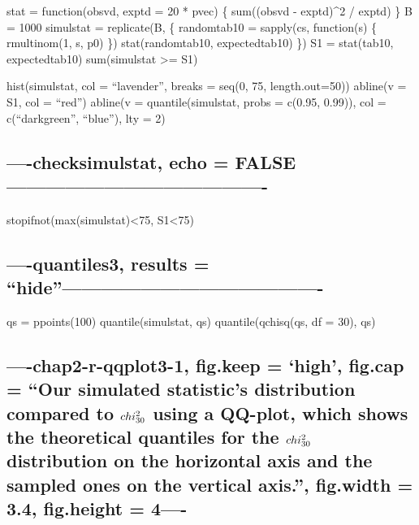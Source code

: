 \documentclass[]{article}
\begin{document}
stat = function(obsvd, exptd = 20 * pvec) \{ sum((obsvd - exptd)\^{}2 /
exptd) \} B = 1000 simulstat = replicate(B, \{ randomtab10 = sapply(cs,
function(s) \{ rmultinom(1, s, p0) \}) stat(randomtab10, expectedtab10)
\}) S1 = stat(tab10, expectedtab10) sum(simulstat \textgreater{}= S1)

hist(simulstat, col = ``lavender'', breaks = seq(0, 75, length.out=50))
abline(v = S1, col = ``red'') abline(v = quantile(simulstat, probs =
c(0.95, 0.99)), col = c(``darkgreen'', ``blue''), lty = 2)

\subsection{----checksimulstat, echo =
FALSE----------------------------------------}\label{checksimulstat-echo-false-}

stopifnot(max(simulstat)\textless{}75, S1\textless{}75)

\subsection{\texorpdfstring{----quantiles3, results =
``hide''----------------------------------------}{----quantiles3, results = hide----------------------------------------}}\label{quantiles3-results-hide-}

qs = ppoints(100) quantile(simulstat, qs) quantile(qchisq(qs, df = 30),
qs)

\subsection{\texorpdfstring{----chap2-r-qqplot3-1, fig.keep = `high',
fig.cap = ``Our simulated statistic's distribution compared to
\(\\chi_{30}^2\) using a QQ-plot, which shows the theoretical
\textbf{quantiles} for the \(\\chi^2_{30}\) distribution on the
horizontal axis and the sampled ones on the vertical axis.'', fig.width
= 3.4, fig.height =
4----}{----chap2-r-qqplot3-1, fig.keep = high, fig.cap = Our simulated statistic's distribution compared to \textbackslash{}\textbackslash{}chi\_\{30\}\^{}2 using a QQ-plot, which shows the theoretical quantiles for the \textbackslash{}\textbackslash{}chi\^{}2\_\{30\} distribution on the horizontal axis and the sampled ones on the vertical axis., fig.width = 3.4, fig.height = 4----}}\label{chap2-r-qqplot3-1-fig.keep-high-fig.cap-our-simulated-statistics-distribution-compared-to-chi_302-using-a-qq-plot-which-shows-the-theoretical-quantiles-for-the-chi2_30-distribution-on-the-horizontal-axis-and-the-sampled-ones-on-the-vertical-axis.-fig.width-3.4-fig.height-4-}
\end{document}
